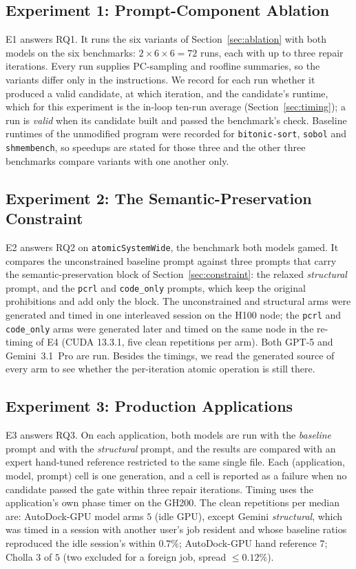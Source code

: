 \subsection{Experiment 1: Prompt-Component Ablation}
\label{sec:setup-e1}
E1 answers RQ1. It runs the six variants of Section~\ref{sec:ablation} with both models on the six
benchmarks: $2 \times 6 \times 6 = 72$ runs, each with up to three repair iterations. Every run
supplies PC-sampling and roofline summaries, so the variants differ only in the instructions. We record
for each run whether it produced a valid candidate, at which iteration, and the candidate's runtime,
which for this experiment is the in-loop ten-run average (Section~\ref{sec:timing}); a run is
\emph{valid} when its candidate built and passed the benchmark's check. Baseline runtimes of the
unmodified program were recorded for \texttt{bitonic-sort}, \texttt{sobol} and \texttt{shmembench},
so speedups are stated for those three and the other three benchmarks compare variants with one
another only.

\subsection{Experiment 2: The Semantic-Preservation Constraint}
\label{sec:setup-e2}
E2 answers RQ2 on \texttt{atomicSystemWide}, the benchmark both models gamed. It compares the
unconstrained baseline prompt against three prompts that carry the semantic-preservation block of
Section~\ref{sec:constraint}: the relaxed \emph{structural} prompt, and the \texttt{pcrl} and
\texttt{code\_only} prompts, which keep the original prohibitions and add only the block. The
unconstrained and structural arms were generated and timed in one interleaved session on the H100 node;
the \texttt{pcrl} and \texttt{code\_only} arms were generated later and timed on the same node in the
re-timing of E4 (CUDA 13.3.1, five clean repetitions per arm). Both GPT-5 and Gemini~3.1~Pro are run.
Besides the timings, we read the generated source of every arm to see whether the per-iteration atomic
operation is still there.

\subsection{Experiment 3: Production Applications}
\label{sec:setup-e3}
E3 answers RQ3. On each application, both models are run with the \emph{baseline} prompt and with the
\emph{structural} prompt, and the results are compared with an expert hand-tuned reference restricted
to the same single file. Each (application, model, prompt) cell is one generation, and a cell is
reported as a failure when no candidate passed the gate within three repair iterations. Timing uses
the application's own phase timer on the GH200. The clean repetitions per median are: AutoDock-GPU
model arms $5$ (idle GPU), except Gemini \emph{structural}, which was timed in a session with another
user's job resident and whose baseline ratios reproduced the idle session's within $0.7\%$;
AutoDock-GPU hand reference $7$; Cholla $3$ of $5$ (two excluded for a foreign job, spread
$\le 0.12\%$).

